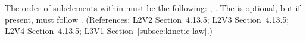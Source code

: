 The order of subelements within \KineticLaw must be the following:
, .  The  is
optional, but if present, must follow .  (References: L2V2
Section~4.13.5; L2V3 Section~4.13.5; L2V4 Section~4.13.5; 
L3V1 Section~\ref{subsec:kinetic-law}.)

